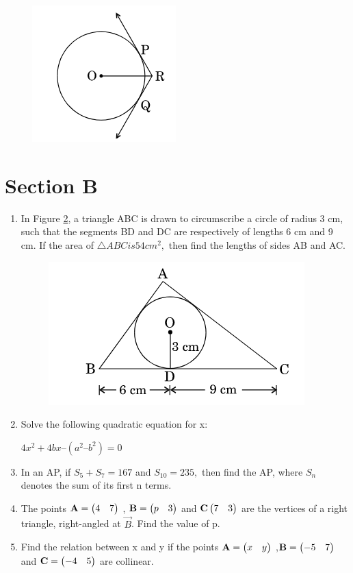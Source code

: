 \documentclass[journal,12pt,twocolumn]{IEEEtran}
\renewcommand\thesection{\arabic{section}}
\begin{document}
\begin{enumerate}[label=\thesection.\arabic*.,ref=\thesection.\theenumi]
  \begin{figure}[h!]
	\centering
    \includegraphics[width=0.5\columnwidth,center]{./fig/image3.png}
	\caption{}
	\label{fig3}
\end{figure}
\end{enumerate}
\section{Section B}
\renewcommand{\theequation}{\theenumi}
\begin{enumerate}[label=\thesection.\arabic*.,ref=\thesection.\theenumi]
\item In Figure \ref{fig4}, a triangle ABC is drawn to circumscribe a circle of radius 3 cm, such that the segments BD and DC are respectively of lengths 6 cm  and 9 cm. If the area of $\triangle ABC is 54 cm^2,$ then find the lengths of sides AB and AC.
\begin{figure}[h!]
	\centering
    \includegraphics[width=0.5\columnwidth,center]{./fig/image4.png}
	\caption{}
	\label{fig4}
\end{figure}
 \item Solve the following quadratic equation for x:
 \begin{center}
     $ 4x^2 + 4bx – (a^2–b^2) = 0 $
 \end{center}
 \item In an AP, if $ S_5 + S_7 = 167 $ and $S_{10}= 235,$ then find the AP, where $ S_n $ denotes the sum of its first n terms.
 \item The points $ \mathbf{A}= \begin{pmatrix}4 & 7\end{pmatrix} $ , $ \mathbf{B}=\begin{pmatrix}p & 3\end{pmatrix} $ and $ \mathbf{C}\begin{pmatrix}7 & 3\end{pmatrix} $ are the vertices of a right triangle, right-angled at $ \vec{B} $. Find the value of p.
 \item Find the relation between x and y if the points $ \mathbf{A}=\begin{pmatrix}x & y\end{pmatrix}$ ,$ \mathbf{B}=\begin{pmatrix}-5&7\end{pmatrix} $ and $ \mathbf{C}=\begin{pmatrix}-4&5\end{pmatrix}$ are collinear.
\end{enumerate}
\end{document}
